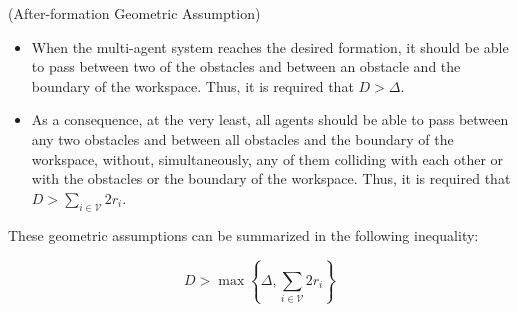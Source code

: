 \begin{gg_box}
\begin{assumption}(After-formation Geometric Assumption)

	\begin{itemize}
		\item When the multi-agent system reaches the desired formation, it should
      be able to pass between two of the obstacles and between an
      obstacle and the boundary of the workspace.
      Thus, it is required that $D > \Delta$.
		\item As a consequence, at the very least, all agents should be able to
      pass between any two obstacles and between all obstacles and the
      boundary of the workspace, without, simultaneously, any of them
      colliding with each other or with the obstacles or the boundary of the
      workspace.
      Thus, it is required that $D >  \sum_{i \in \mathcal{V}}^{} 2r_i$.
	\end{itemize}

	These geometric assumptions can be summarized in the following
  inequality:

	\begin{equation}
    D > \max\left\{\Delta, \sum_{i \in \mathcal{V}}^{} 2r_i \right\}
  \label{eq:geometric_constraint}
	\end{equation}

\label{ass:after_formation_geometry}
\end{assumption}
\end{gg_box}
